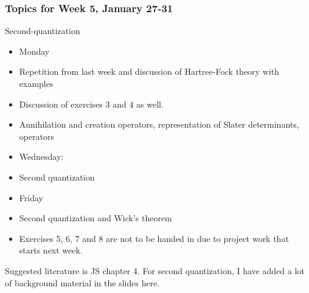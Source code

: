 \documentclass[compress]{beamer}
\begin{document}
\frame
{
  \frametitle{Topics for Week 5, January 27-31}
  \begin{block}{Second-quantization}
\begin{itemize}
\item Monday
\item Repetition from last week  and discussion of Hartree-Fock theory with examples
\item Discussion of exercises 3 and 4 as well.
\item Annihilation and creation operators, representation of Slater determinants, operators
\item Wednesday:
\item Second quantization
\item Friday
\item Second quantization and Wick's theorem
\item Exercises 5, 6, 7 and 8 are not to be handed in due to project work that starts next week. 
\end{itemize}
Suggested literature is JS chapter 4. For second quantization, I have added a lot of background material in the slides here. 
  \end{block}
} 

\end{document}
